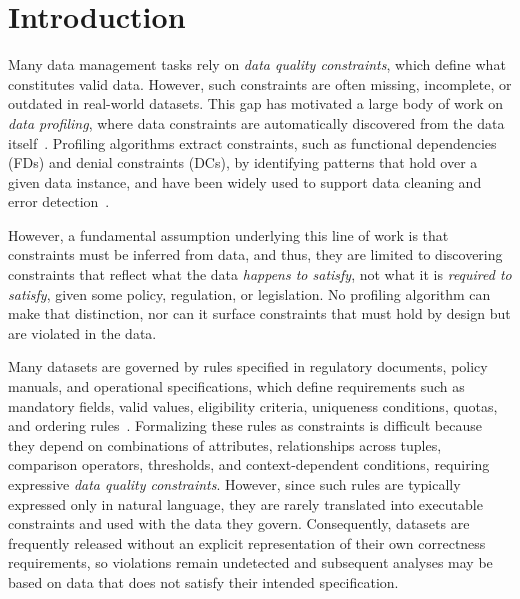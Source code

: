 \section{Introduction}
\label{sec:intro}

Many data management tasks rely on \emph{data quality constraints}, which define what constitutes valid data.
However, such constraints are often missing, incomplete, or outdated in real-world datasets. This gap has motivated a large body of work on \emph{data profiling}, where data constraints are automatically discovered from the data itself~\cite{profSurveyFelix2015}. 
Profiling algorithms extract constraints, such as functional dependencies (FDs) and denial constraints (DCs), by identifying patterns that hold over a given data instance, and have been widely used to support data cleaning and error detection~\cite{dependencyTree2020}.

However, a fundamental assumption underlying this line of work is that constraints must be inferred from data, and thus, they are limited to discovering constraints that reflect what the data \emph{happens to satisfy}, not what it is \emph{required to satisfy}, given some policy, regulation, or legislation. No profiling algorithm can make that distinction, nor can it surface constraints that must hold by design but are violated in the data.

Many datasets are governed by rules specified in regulatory documents, policy manuals, and operational specifications, which define requirements such as mandatory fields, valid values, eligibility criteria, uniqueness conditions, quotas, and ordering rules~\cite{batini2009methodologies,serra2024IQcontextDtaQuality,CABALLERO2022102058}. Formalizing these rules as constraints is difficult because they depend on combinations of attributes, relationships across tuples, comparison operators, thresholds, and context-dependent conditions, requiring expressive \emph{data quality constraints}. However, since such rules are typically expressed only in natural language, they are rarely translated into executable constraints and used with the data they govern. Consequently, datasets are frequently released without an explicit representation of their own correctness requirements, so violations remain undetected and subsequent analyses may be based on data that does not satisfy their intended specification.

